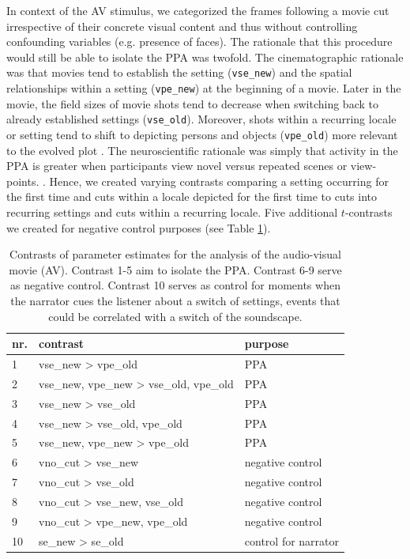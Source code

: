 \documentclass[english]{article}
\begin{document}
In context of the AV stimulus, we categorized the frames following a movie cut
irrespective of their concrete visual content and thus without controlling
confounding variables (e.g. presence of faces). The rationale that this
procedure would still be able to isolate the PPA was twofold.
The cinematographic rationale was that movies tend to establish the setting
(\texttt{vse\_new}) and the spatial relationships within a setting
(\texttt{vpe\_new}) at the beginning of a movie.
Later in the movie, the field sizes of movie shots tend to decrease when
switching back to already established settings (\texttt{vse\_old}).
Moreover, shots within a recurring locale or setting tend to shift to depicting
persons and objects (\texttt{vpe\_old}) more relevant to the evolved plot
\citep{brown2012cinematography, mercado2011filmmakers}.
The neuroscientific rationale was simply that activity in the PPA is greater
when participants view novel versus repeated scenes or view-points.
\citep{epstein1999parahippocampal}.
Hence, we created varying contrasts comparing a setting occurring for the first
time and cuts within a locale depicted for the first time to cuts into recurring
settings and cuts within a recurring locale.
Five additional $t$-contrasts we created for negative control purposes (see
Table \ref{tab:av-contrasts}).


\begin{table}[t]
    \caption{Contrasts of parameter estimates for the analysis of the audio-visual movie (AV).
Contrast 1-5 aim to isolate the PPA.
    Contrast 6-9 serve as negative control.
    Contrast 10 serves as control for moments when the narrator cues the
    listener about a switch of settings, events that could be correlated with a
    switch of the soundscape.}
\label{tab:av-contrasts}
\footnotesize
\begin{tabular}{lll}
\toprule
\textbf{nr.} &  \textbf{contrast} & \textbf{purpose} \\
\midrule
1 & vse\_new > vpe\_old & PPA \tabularnewline
2 & vse\_new, vpe\_new > vse\_old, vpe\_old & PPA \tabularnewline
3 & vse\_new > vse\_old & PPA \tabularnewline
4 & vse\_new > vse\_old, vpe\_old & PPA \tabularnewline
5 & vse\_new, vpe\_new > vpe\_old & PPA \tabularnewline
6 & vno\_cut > vse\_new & negative control \tabularnewline
7 & vno\_cut > vse\_old & negative control \tabularnewline
8 & vno\_cut > vse\_new, vse\_old & negative control \tabularnewline
9 & vno\_cut > vpe\_new, vpe\_old & negative control \tabularnewline
10 & se\_new > se\_old & control for narrator \tabularnewline
\end{tabular}
\end{table}
\end{document}
